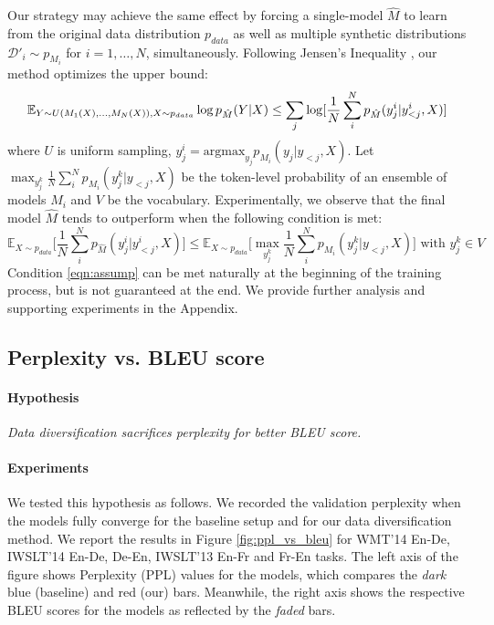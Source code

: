 \documentclass{article}
\def\gD{{\mathcal{D}}}
\newcommand{\E}{\mathbb{E}}
\begin{document}
Our strategy may achieve the same effect by forcing a single-model $\hat{M}$ to learn from the original data distribution $p_{data}$ as well as multiple synthetic distributions $\gD'_i \sim p_{M_i}$ for $i= 1, \ldots, N$, simultaneously. Following Jensen's Inequality \citep{jensen1906fonctions}, our method optimizes the upper bound:
\vspace{-0.5em}
\begin{equation}
    \E_{Y\sim U({M_1}(X),...,{M_N}(X)),X\sim p_{data}} \log p_{\hat{M}}(Y|X) \leq \sum_j \log [\frac{1}{N} \sum_{i}^N p_{\hat{M}}(y^i_j|y_{<j}^i,X)]
    \vspace{-0.2em}
\end{equation}
where $U$ is uniform sampling, $y^i_j = \text{argmax}_{y_j} p_{M_i}(y_j|y_{<j},X)$. Let $\max_{y_j^k}\frac{1}{N}\sum_i^N p_{M_i}(y^k_j|y_{<j},X)$ be the token-level probability of an ensemble of models $M_i$ and $V$ be the vocabulary. Experimentally, we observe that the final model $\hat{M}$ tends to outperform when the following condition is met:
\vspace{-0.5em}
\begin{equation}
    \E_{X\sim p_{data}} \Big[ \frac{1}{N}\sum_i^N p_{\hat{M}}(y^i_j|y_{<j}^i,X) \Big] \leq \E_{X\sim p_{data}} \Big[ \max_{y_j^k}\frac{1}{N}\sum_i^N p_{M_i}(y^k_j|y_{<j},X) \Big] \mbox{  with  } y_j^k \in V \label{eqn:assump}
\end{equation}
Condition \ref{eqn:assump} can be met naturally at the beginning of the training process, but is not guaranteed at the end. We provide further analysis and supporting experiments in the Appendix.
 





\subsection{Perplexity vs. BLEU score} 

\paragraph{Hypothesis} \emph{Data diversification sacrifices perplexity for better BLEU score.
}

\vspace{-0.5em}
\paragraph{Experiments}

We tested this hypothesis as follows. We recorded the validation perplexity when the models fully converge for the baseline setup and for our data diversification method. We report the results  in Figure \ref{fig:ppl_vs_bleu} for WMT'14 En-De, IWSLT'14 En-De, De-En, IWSLT'13 En-Fr and Fr-En tasks. The left axis of the figure shows Perplexity (PPL) values for the models, which compares the \emph{dark} blue (baseline) and red (our) bars. Meanwhile, the right axis shows the respective BLEU scores for the models as reflected by the \emph{faded} bars.
\end{document}

